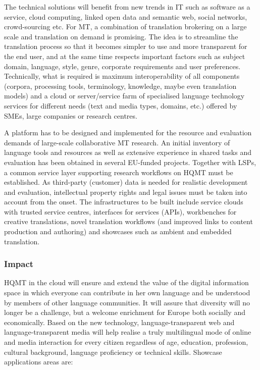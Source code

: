 \documentclass[10pt, plain]{../../metanetpaper}
\begin{document}
\begin{multicols}{2}
The technical solutions will benefit from new trends in IT such as software as a service, cloud computing, linked open data and semantic web, social networks, crowd-sourcing etc. For MT, a combination of translation brokering on a large scale and translation on demand is promising. The idea is to streamline the translation process so that it becomes simpler to use and more transparent for the end user, and at the same time respects important factors such as subject domain, language, style, genre, corporate requirements and user preferences. Technically, what is required is maximum interoperability of all components (corpora, processing tools, terminology, knowledge, maybe even translation models) and a cloud or server/service farm of specialised language technology services for different needs (text and media types, domains, etc.) offered by SMEs, large companies or research centres.

A platform has to be designed and implemented for the resource and evaluation demands of large-scale collaborative MT research. An initial inventory of language tools and resources as well as extensive experience in shared tasks and evaluation has been obtained in several EU-funded projects. Together with LSPs, a common service layer supporting research workflows on HQMT must be established. As third-party (customer) data is needed for realistic development and evaluation, intellectual property rights and legal issues must be taken into account from the onset. The infrastructures to be built include service clouds with trusted service centres, interfaces for services (APIs), workbenches for creative translations, novel translation workflows (and improved links to content production and authoring) and showcases such as ambient and embedded translation.

\subsubsection{Impact}
\label{sec:impact-pt1}

HQMT in the cloud will ensure and extend the value of the digital information space in which everyone can contribute in her own language and be understood by members of other language communities. It will assure that diversity will no longer be a challenge, but a welcome enrichment for Europe both socially and economically. Based on the new technology, language-transparent web and language-transparent media will help realise a truly multilingual mode of online and media interaction for every citizen regardless of age, education, profession, cultural background, language proficiency or technical skills. Showcase applications areas are:


\end{multicols}
\end{document}
